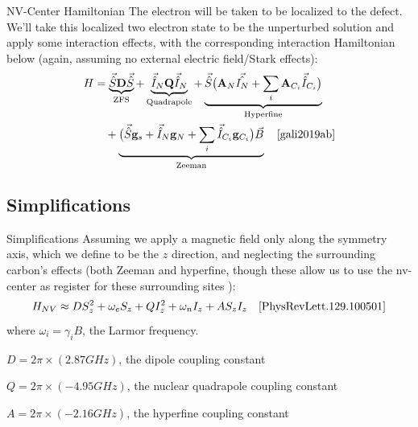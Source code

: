 \documentclass[11pt]{beamer}
\begin{document}
\begin{frame}{NV-Center Hamiltonian}
The electron will be taken to be localized to the defect. We'll take this localized two electron state to be the unperturbed solution and apply some interaction effects, with the corresponding interaction Hamiltonian below (again, assuming no external electric field/Stark effects):
\begin{align*}
H&=\underbrace{\vec{\hat{S}}\mathbf{D}\vec{\hat{S}}}_{\text{ZFS}} +   \underbrace{\vec{\hat{I}}_N\mathbf{Q} \vec{\hat{I}}_N}_{\text{Quadrapole}}+\underbrace{\vec{\hat{S}}\big(\mathbf{A}_N\vec{\hat{I_N}}+\sum_i\mathbf{A}_{C_i}\vec{\hat{I}}_{C_i}\big)}_{\text{Hyperfine}}\\
&\quad +\underbrace{\big(\vec{\hat{S}}\mathbf{g}_s+\vec{\hat{I}}_N\mathbf{g}_N+\sum_i\vec{\hat{I}}_{C_i}\mathbf{g}_{C_i}\big)\vec{B}}_{\text{Zeeman}}\quad\cite{gali2019ab}\\
\end{align*}
\end{frame}
\subsection{Simplifications}
\begin{frame}{Simplifications}
Assuming we apply a magnetic field only along the symmetry axis, which we define to be the $z$ direction\pause , and neglecting the surrounding carbon's effects (both Zeeman and hyperfine, though these allow us to use the nv-center as register for these surrounding sites \cite{PhysRevX.9.031045}):
$$
H_{NV}\approx DS_z^2 + \omega_eS_z + QI_z^2 +\omega_nI_z + AS_zI_z\quad\cite{PhysRevLett.129.100501}
$$
where $\omega_i = \gamma_i B$, the Larmor frequency. 

$D=2\pi\times (2.87 GHz)$, the dipole coupling constant

$Q=2\pi\times (-4.95 GHz)$, the nuclear quadrapole coupling constant

$A=2\pi\times (-2.16 GHz)$, the hyperfine coupling constant

\end{frame}
\end{document}

